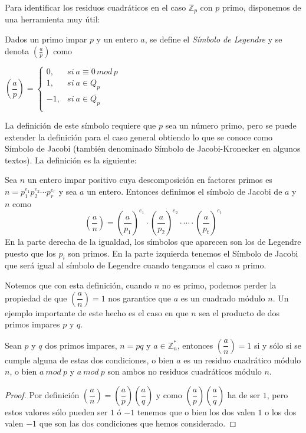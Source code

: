 Para identificar los residuos cuadráticos en el caso ${\mathbb Z}_p$ con $p$ primo, disponemos de una herramienta muy útil:

\begin{definition}
	Dados un primo impar $p$ y un entero $a$, se define el {\em Símbolo de Legendre} y se denota $\left( \frac{a}{p} \right) $ como

	\begin{center}
		$
		\left( \dfrac{a}{p} \right) =
		\begin{cases}
			0, & si\ a \equiv 0 \, mod \, p\\
			1, & si\ a \in Q_p  \\
			-1, & si\ a \in \overline{Q_p} \\
		\end{cases}
		$
	\end{center}
\end{definition}

La definici\'on de este s\'imbolo requiere que $p$ sea un n\'umero primo, pero se puede extender la definici\'on para el caso general obtiendo lo que se conoce
como S\'imbolo de Jacobi (tambi\'en denominado S\'imbolo de Jacobi-Kronecker en algunos textos). La definici\'on es la siguiente:

\begin{definition}
Sea $n$ un entero impar positivo cuya descomposici\'on en factores primos es $n = p_1^{e_1} p_2^{e_2} \cdots p_r^{e_r}$ y sea $a$ un entero. Entonces definimos
el s\'imbolo de Jacobi de $a$ y $n$ como
\[\left( \dfrac{a}{n} \right) = \left( \dfrac{a}{p_1} \right)^{e_1} \cdot \left( \dfrac{a}{p_2} \right)^{e_2} \cdot \cdots \cdot \left( \dfrac{a}{p_t} \right)^{e_t}\]
En la parte derecha de la igualdad, los s\'imbolos que aparecen son los de Legendre puesto que los $p_i$ son primos. En la parte izquierda tenemos el S\'imbolo de Jacobi
que ser\'a igual al s\'imbolo de Legendre cuando tengamos el caso $n$ primo.
\end{definition}

Notemos que con esta definici\'on, cuando $n$ no es primo, podemos perder la propiedad de que $\left( \dfrac{a}{n} \right) = 1$ nos garantice que $a$ es un cuadrado m\'odulo $n$.
Un ejemplo importante de este hecho es el caso en que $n$ sea el producto de dos primos impares $p$ y $q$.

\begin{proposition}
\label{propResiduosPQ}
Sean $p$ y $q$ dos primos impares, $n = pq$ y $a \in {\mathbb Z}_n^*$, entonces $\left( \dfrac{a}{n} \right) = 1$ si y s\'olo si se cumple alguna de estas dos condiciones, o
bien $a$ es un residuo cuadr\'atico m\'odulo $n$, o bien $a~mod~p$ y $a~mod~p$ son ambos no residuos cuadr\'aticos m\'odulo $n$.
\end{proposition}
\begin{proof}
Por definici\'on $\left( \dfrac{a}{n} \right) = \left( \dfrac{a}{p} \right) \left( \dfrac{a}{q} \right)$ y como $\left( \dfrac{a}{p} \right) \left( \dfrac{a}{q} \right)$
ha de ser $1$, pero estos valores s\'olo pueden ser $1$ \'o $-1$ tenemos que o bien los dos valen $1$ o los dos valen $-1$ que son las dos condiciones que hemos considerado.
\end{proof}

